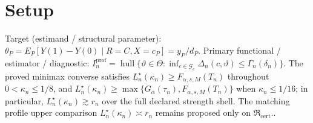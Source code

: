 \documentclass{article}
\begin{document}
\section{Setup}

Target (estimand / structural parameter): \(\theta_P=E_P[Y(1)-Y(0)\mid R=C,X=c_P]=y_P/d_P\).
Primary functional / estimator / diagnostic: \(I_n^{\mathrm{prof}}=\operatorname{hull}\{\vartheta\in\Theta:\inf_{c\in\mathcal G_c}\Delta_n(c,\vartheta)\le\Gamma_n(\delta_n)\}\). The proved minimax converse satisfies \(L_n^\star(\kappa_n)\ge F_{\alpha,s,M}(T_n)\) throughout \(0<\kappa_n\le1/8\), and \(L_n^\star(\kappa_n)\ge\max\{G_\alpha(\tau_n),F_{\alpha,s,M}(T_n)\}\) when \(\kappa_n\le1/16\); in particular, \(L_n^\star(\kappa_n)\gtrsim r_n\) over the full declared strength shell. The matching profile upper comparison \(L_n^\star(\kappa_n)\asymp r_n\) remains proposed only on \(\mathfrak R_{\mathrm{cert}}\)..
\end{document}
